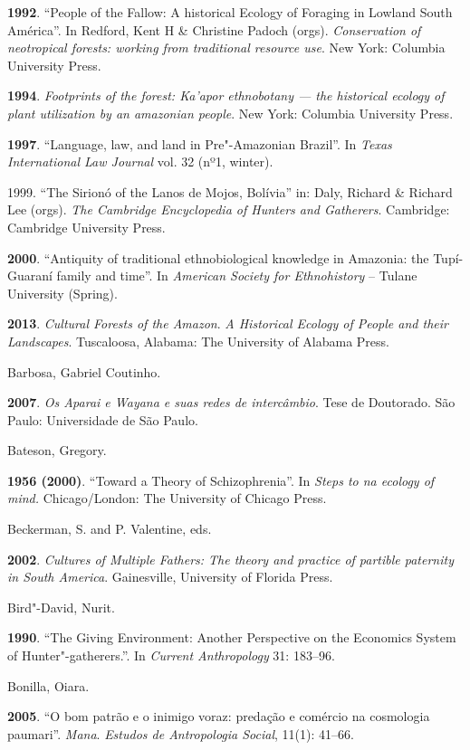 \begin{Parskip}
\textbf{1992}. ``People of the Fallow: A historical Ecology of Foraging
in Lowland South América''. In Redford, Kent H \& Christine Padoch
(orgs). \emph{Conservation of neotropical forests: working from
traditional resource use}. New York: Columbia University Press.

\textbf{1994}. \emph{Footprints of the forest: Ka'apor ethnobotany ---
the historical ecology of plant utilization by an amazonian people}. New
York: Columbia University Press.

\textbf{1997}. ``Language, law, and land in Pre"-Amazonian Brazil''. In
\emph{Texas International Law Journal} vol. 32 (nº1, winter).

1999. ``The Sirionó of the Lanos de Mojos, Bolívia'' in: Daly, Richard
\& Richard Lee (orgs). \emph{The Cambridge Encyclopedia of Hunters and
Gatherers}. Cambridge: Cambridge University Press.

\textbf{2000}. ``Antiquity of traditional ethnobiological knowledge in
Amazonia: the Tupí-Guaraní family and time''. In \emph{American Society
for Ethnohistory} -- Tulane University (Spring).

\textbf{2013}. \emph{Cultural Forests of the Amazon}. \emph{A Historical
Ecology of People and their Landscapes}. Tuscaloosa, Alabama: The
University of Alabama Press. 

Barbosa, Gabriel Coutinho.

\textbf{2007}. \emph{Os Aparai e Wayana e suas redes de intercâmbio}.
Tese de Doutorado. São Paulo: Universidade de São Paulo.

Bateson, Gregory.

\textbf{1956 (2000)}. ``Toward a Theory of Schizophrenia''. In
\emph{Steps to na ecology of mind.} Chicago/London: The University of
Chicago Press.

Beckerman, S. and P. Valentine, eds.

\textbf{2002}. \emph{Cultures of Multiple Fathers: The theory and
practice of partible paternity in South America}. Gainesville,
University of Florida Press.

Bird"-David, Nurit.

\textbf{1990}. ``The Giving Environment: Another Perspective on the
Economics System of Hunter"-gatherers.''. In \emph{Current Anthropology}
31: 183--96.

Bonilla, Oiara.

\textbf{2005}. ``O bom patrão e o inimigo voraz: predação e comércio na
cosmologia paumari''. \emph{Mana}. \emph{Estudos de Antropologia
Social}, 11(1): 41--66.


\end{Parskip}
